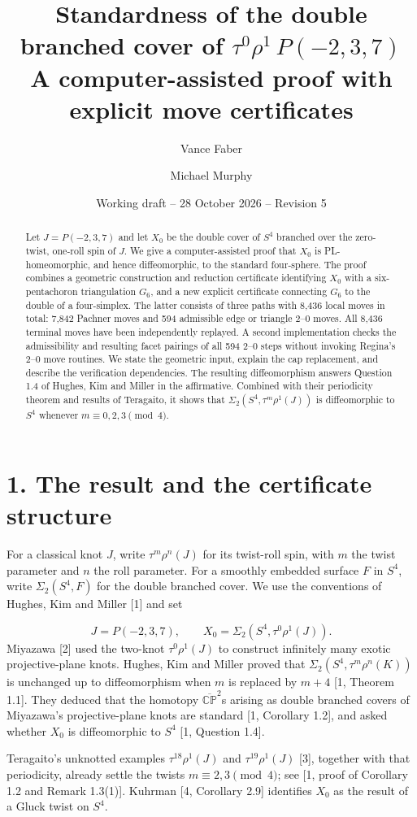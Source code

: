 \documentclass[11pt,letterpaper]{article}
\title{Standardness of the double branched cover of $\tau^0\rho^1\,P(-2,3,7)$\\[0.4em]\large A computer-assisted proof with explicit move certificates}
\author{Vance Faber \and Michael Murphy}
\date{Working draft -- 28 October 2026 -- Revision 5}
\begin{document}
\maketitle
\begin{abstract}
Let $J=P(-2,3,7)$ and let $X_0$ be the double cover of $S^4$ branched over the zero-twist, one-roll spin of $J$. We give a computer-assisted proof that $X_0$ is PL-homeomorphic, and hence diffeomorphic, to the standard four-sphere. The proof combines a geometric construction and reduction certificate identifying $X_0$ with a six-pentachoron triangulation $G_6$, and a new explicit certificate connecting $G_6$ to the double of a four-simplex. The latter consists of three paths with 8,436 local moves in total: 7,842 Pachner moves and 594 admissible edge or triangle 2--0 moves. All 8,436 terminal moves have been independently replayed. A second implementation checks the admissibility and resulting facet pairings of all 594 2--0 steps without invoking Regina's 2--0 move routines. We state the geometric input, explain the cap replacement, and describe the verification dependencies. The resulting diffeomorphism answers Question 1.4 of Hughes, Kim and Miller in the affirmative. Combined with their periodicity theorem and results of Teragaito, it shows that $\Sigma_2(S^4,\tau^m\rho^1(J))$ is diffeomorphic to $S^4$ whenever $m\equiv0,2,3\pmod4$.
\end{abstract}
\section*{1. The result and the certificate structure}
For a classical knot $J$, write $\tau^m\rho^n(J)$ for its twist-roll spin, with $m$ the twist parameter and $n$ the roll parameter. For a smoothly embedded surface $F$ in $S^4$, write $\Sigma_2(S^4,F)$ for the double branched cover. We use the conventions of Hughes, Kim and Miller [1] and set

\[
J=P(-2,3,7),\qquad X_0=\Sigma_2\!\left(S^4,\tau^0\rho^1(J)\right).
\]
Miyazawa [2] used the two-knot $\tau^0\rho^1(J)$ to construct infinitely many exotic projective-plane knots. Hughes, Kim and Miller proved that $\Sigma_2(S^4,\tau^m\rho^n(K))$ is unchanged up to diffeomorphism when $m$ is replaced by $m+4$ [1, Theorem 1.1]. They deduced that the homotopy $\overline{\mathbb{CP}}^{2}$s arising as double branched covers of Miyazawa's projective-plane knots are standard [1, Corollary 1.2], and asked whether $X_0$ is diffeomorphic to $S^4$ [1, Question 1.4].

Teragaito's unknotted examples $\tau^{18}\rho^1(J)$ and $\tau^{19}\rho^1(J)$ [3], together with that periodicity, already settle the twists $m\equiv2,3\pmod4$; see [1, proof of Corollary 1.2 and Remark 1.3(1)]. Kuhrman [4, Corollary 2.9] identifies $X_0$ as the result of a Gluck twist on $S^4$.
\end{document}
